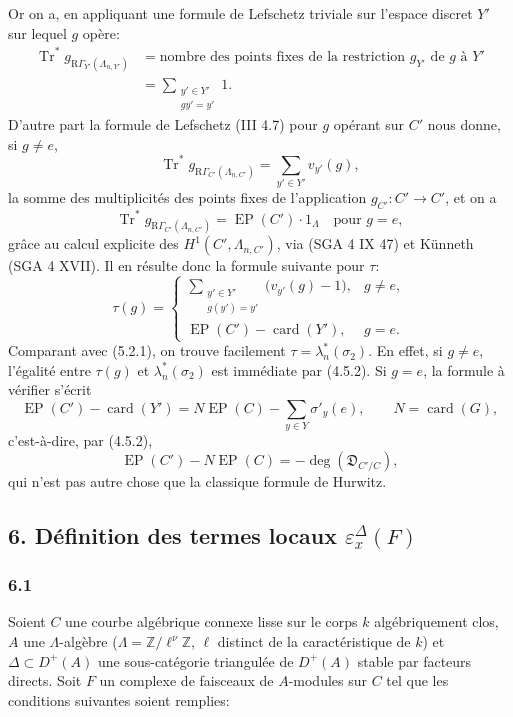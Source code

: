 \documentclass[11pt]{article}
\providecommand{\Tr}{\operatorname{Tr}}
\providecommand{\EP}{\operatorname{EP}}
\providecommand{\Tr}{\operatorname{Tr}}
\providecommand{\Tr}{\operatorname{Tr}}
\providecommand{\Tr}{\operatorname{Tr}}
\providecommand{\EP}{\operatorname{EP}}
\providecommand{\RG}{\mathrm R\Gamma}
\providecommand{\Tr}{\operatorname{Tr}}
\begin{document}
Or on a, en appliquant une formule de Lefschetz triviale sur l'espace discret $Y'$ sur lequel $g$ opère:
\[
\begin{aligned}
\Tr^*g_{\RG_{Y'}(\Lambda_{n,Y'})}
&=\text{nombre des points fixes de la restriction } g_{Y'} \text{ de } g \text{ à } Y'\\
&=\sum_{\substack{y'\in Y'\\gy'=y'}}1.
\end{aligned}
\]
D'autre part la formule de Lefschetz (III 4.7) pour $g$ opérant sur $C'$ nous donne, si $g\ne e$,
\[
\Tr^*g_{\RG_{C'}(\Lambda_{n,C'})}
=
\sum_{y'\in Y'} v_{y'}(g),
\]
la somme des multiplicités des points fixes de l'application $g_{C'}:C'\to C'$, et on a
\[
\Tr^*g_{\RG_{C'}(\Lambda_{n,C'})}=\EP(C')\cdot1_\Lambda
\quad\text{pour }g=e,
\]
grâce au calcul explicite des $H^1(C',\Lambda_{n,C'})$, via (SGA 4 IX 47) et Künneth (SGA 4 XVII). Il en résulte donc la formule suivante pour $\tau$:
\[
\tau(g)=
\begin{cases}
\displaystyle\sum_{\substack{y'\in Y'\\g(y')=y'}}\bigl(v_{y'}(g)-1\bigr),& g\ne e,\\[0.8em]
\EP(C')-\operatorname{card}(Y'),& g=e.
\end{cases}
\tag{5.2.2}
\]
Comparant avec (5.2.1), on trouve facilement $\tau=\lambda_n^*(\sigma_2)$. En effet, si $g\ne e$, l'égalité entre $\tau(g)$ et $\lambda_n^*(\sigma_2)$ est immédiate par (4.5.2). Si $g=e$, la formule à vérifier s'écrit
\[
\EP(C')-\operatorname{card}(Y')
=
N\EP(C)-\sum_{y\in Y}\sigma'_y(e),
\qquad N=\operatorname{card}(G),
\]
c'est-à-dire, par (4.5.2),
\[
\EP(C')-N\EP(C)=-\deg(\mathfrak D_{C'/C}),
\]
qui n'est pas autre chose que la classique formule de Hurwitz.

\subsection*{6. Définition des termes locaux $\varepsilon_x^\Delta(F)$}

\subsubsection*{6.1}

Soient $C$ une courbe algébrique connexe lisse sur le corps $k$ algébriquement clos, $A$ une $\Lambda$-algèbre ($\Lambda=\mathbb Z/\ell^\nu\mathbb Z$, $\ell$ distinct de la caractéristique de $k$) et $\Delta\subset D^+(A)$ une sous-catégorie triangulée de $D^+(A)$ stable par facteurs directs. Soit $F$ un complexe de faisceaux de $A$-modules sur $C$ tel que les conditions suivantes soient remplies:
\end{document}
